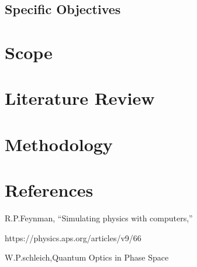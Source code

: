 \documentclass[options]{article}
\begin{document}
\subsection{Specific Objectives}

\section {\textbf{Scope}}

\section{\textbf{Literature Review }}


\section {\textbf{Methodology}}

\section{\textbf{References}}
R.P.Feynman, “Simulating physics with computers,”

https://physics.aps.org/articles/v9/66 

W.P.schleich,Quantum Optics in Phase Space 
\end{document}

